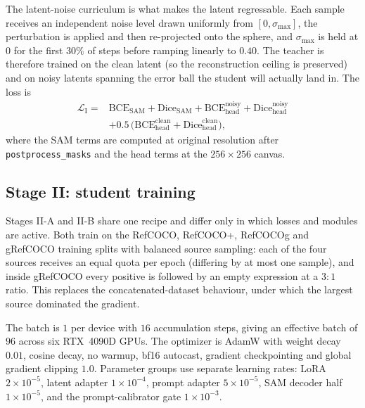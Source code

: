 The latent-noise curriculum is what makes the latent regressable. Each sample receives an independent noise level drawn uniformly from $[0,\sigma_{\max}]$, the perturbation is applied and then re-projected onto the sphere, and $\sigma_{\max}$ is held at $0$ for the first $30\%$ of steps before ramping linearly to $0.40$. The teacher is therefore trained on the clean latent (so the reconstruction ceiling is preserved) and on noisy latents spanning the error ball the student will actually land in. The loss is
\begin{equation}
\begin{aligned}
\mathcal{L}_{\mathrm{I}} = {}& \mathrm{BCE}_{\mathrm{SAM}} + \mathrm{Dice}_{\mathrm{SAM}}
 + \mathrm{BCE}^{\mathrm{noisy}}_{\mathrm{head}} + \mathrm{Dice}^{\mathrm{noisy}}_{\mathrm{head}} \\
 & + 0.5\,\bigl(\mathrm{BCE}^{\mathrm{clean}}_{\mathrm{head}} + \mathrm{Dice}^{\mathrm{clean}}_{\mathrm{head}}\bigr),
\end{aligned}
\end{equation}
where the SAM terms are computed at original resolution after \texttt{postprocess\_masks} and the head terms at the $256\times256$ canvas.

\subsection{Stage II: student training}
\label{sec:app_stage2}

Stages II-A and II-B share one recipe and differ only in which losses and modules are active. Both train on the RefCOCO, RefCOCO+, RefCOCOg and gRefCOCO training splits with balanced source sampling: each of the four sources receives an equal quota per epoch (differing by at most one sample), and inside gRefCOCO every positive is followed by an empty expression at a $3{:}1$ ratio. This replaces the concatenated-dataset behaviour, under which the largest source dominated the gradient.

The batch is $1$ per device with $16$ accumulation steps, giving an effective batch of $96$ across six RTX~4090D GPUs. The optimizer is AdamW with weight decay $0.01$, cosine decay, no warmup, bf16 autocast, gradient checkpointing and global gradient clipping $1.0$. Parameter groups use separate learning rates: LoRA $2\times10^{-5}$, latent adapter $1\times10^{-4}$, prompt adapter $5\times10^{-5}$, SAM decoder half $1\times10^{-5}$, and the prompt-calibrator gate $1\times10^{-3}$.

